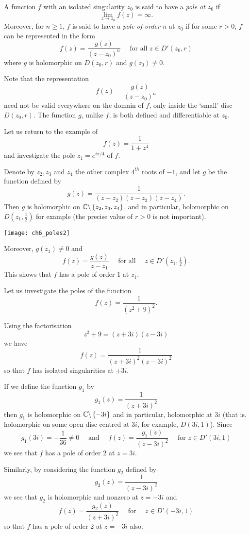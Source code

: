 \begin{definition}
A function $f$ with an isolated singularity $z_0$ is said to have a \emph{pole at $z_0$} if
\[
\lim_{z \to z_0} f(z) = \infty.
\]
Moreover, for $n \geq 1$, $f$ is said to have a \emph{pole of order $n$} at $z_0$ if for some $r>0$, $f$ can be represented in the form
\[
f(z) = \frac{g(z)}{(z-z_0)^n}\quad\text{ for all } z \in D'(z_0,r)
\]
where $g$ is holomorphic on $D(z_0,r)$ and $g(z_0) \neq 0$.
\end{definition}
Note that the representation
\[
f(z) = \frac{g(z)}{(z-z_0)^n}
\]
need not be valid everywhere on the domain of $f$, only inside the `small' disc $D(z_0,r)$.  The function $g$, unlike $f$, is both defined and differentiable at $z_0$.

\begin{example}
Let us return to the example of
\[
f(z) = \frac{1}{1+z^4}
\]
and investigate the pole $z_1 = e^{i\pi/4}$ of $f$.
\end{example}
\begin{solution}
Denote by $z_2,z_3$ and $z_4$ the other complex $4^{th}$ roots of $-1$, and let $g$ be the function defined by
\[
g(z) = \frac{1}{(z-z_2)(z-z_3)(z-z_4)}.
\]
Then $g$ is holomorphic on $\mathbb{C} \backslash \left\{z_2,z_3,z_4\right\}$, and in particular, holomorphic on $D(z_1,\frac{1}{2})$ for example (the precise value of $r>0$ is not important).
\begin{center}
\texttt{[image: ch6\_poles2]}
\end{center}
Moreover, $g(z_1) \neq 0$ and
\[
f(z) = \frac{g(z)}{z-z_1} \quad \text{ for all }\quad z \in D'(z_1,\tfrac{1}{2}).
\]
This shows that $f$ has a pole of order $1$ at $z_1$.
\end{solution}








\begin{example}
\label{e:poles2}
Let us investigate the poles of  the function
\[
f(z) = \frac{1}{(z^2+9)^2}.
\]
\end{example}
\begin{solution}
Using the factorisation
\[
z^2+9 = (z+3i)(z-3i)
\]
we have
\[
f(z)= \frac{1}{(z+3i)^2(z-3i)^2}
\]
so that $f$ has isolated singularities at $\pm 3i$.

If we define the function $g_1$ by
\[
g_1(z) = \frac{1}{(z+3i)^2}
\]
then $g_1$ is holomorphic on $\mathbb{C} \backslash \left\{-3i\right\}$ and in particular, holomorphic at $3i$ (that is, holomorphic on some open disc centred at $3i$, for example, $D(3i,1)$).  Since
\[
g_1(3i) = - \frac{1}{36} \neq 0 \quad\text{ and }\quad f(z) = \frac{g_1(z)}{(z-3i)^2} \quad\text{ for } z \in D'(3i,1)
\]
we see that $f$ has a pole of order $2$ at $z=3i$.

Similarly, by considering the function $g_2$ defined by
\[
g_2(z) = \frac{1}{(z-3i)^2}
\]
we see that $g_2$ is holomorphic and nonzero at $z=-3i$ and
\[
f(z) = \frac{g_2(z)}{(z+3i)^2}\quad\text{ for }\quad z \in D'(-3i,1)
\]
so that $f$ has a pole of order $2$ at $z=-3i$ also.
\end{solution}

